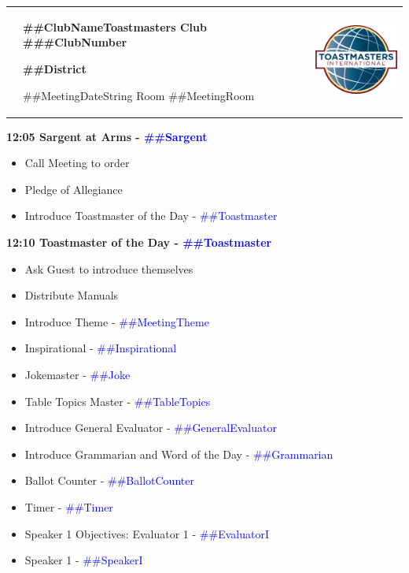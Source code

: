 \documentclass{article}
\newcommand{\clubName}{##ClubName}
\newcommand{\clubNumber}{##ClubNumber}
\newcommand{\district}{##District}
\newcommand{\meetingRoom}{##MeetingRoom}
\newcommand{\meetingTheme}{##MeetingTheme}
\newcommand{\meetingDateString}{##MeetingDateString}
\newcommand{\toastmaster}{##Toastmaster}
\newcommand{\sargent}{##Sargent}
\newcommand{\tableTopics}{##TableTopics}
\newcommand{\generalEvaluator}{##GeneralEvaluator}
\newcommand{\evaluatorI}{##EvaluatorI}
\newcommand{\speakerI}{##SpeakerI}
\newcommand{\grammarian}{##Grammarian}
\newcommand{\timer}{##Timer}
\newcommand{\inspirational}{##Inspirational}
\newcommand{\ballotCounter}{##BallotCounter}
\newcommand{\joke}{##Joke}
\begin{document}
  \begin{spacing}{.8}
  \begin{tabular}{ p{4cm} p{12cm} p{4cm}}
    {\bf }
    &
    \begin{center}
      {\bf \clubName Toastmasters Club \#\clubNumber}
    
	  {\bf \district}
    
	  \meetingDateString{} Room \meetingRoom
    \end{center}      
    &
    \includegraphics[width=3cm]{logo}
  \end{tabular}
  {\Large \bf12:05 Sargent at Arms - \textcolor{blue}{\sargent{}}}
  \begin{itemize}
    \item Call Meeting to order
    \item Pledge of Allegiance
    \item Introduce Toastmaster of the Day - \textcolor{blue}{\toastmaster{}}
  \end{itemize}
  {\Large \bf12:10 Toastmaster of the Day - \textcolor{blue}{\toastmaster{}}} 
  \begin{itemize}
    \item Ask Guest to introduce themselves
    \item Distribute Manuals
    \item Introduce Theme - \textcolor{blue}{\meetingTheme{}}
    \item Inspirational - \textcolor{blue}{\inspirational{}}
    \item Jokemaster - \textcolor{blue}{\joke{}}
	\item Table Topics Master - \textcolor{blue}{\tableTopics{}}
    \item Introduce General Evaluator - \textcolor{blue}{\generalEvaluator{}}
	\item Introduce Grammarian and Word of the Day - \textcolor{blue}{\grammarian{}}
    \item Ballot Counter - \textcolor{blue}{\ballotCounter{}}
    \item Timer - \textcolor{blue}{\timer{}}
    \item Speaker 1 Objectives: Evaluator 1 - \textcolor{blue}{\evaluatorI{}}
    \item Speaker 1 - \textcolor{blue}{\speakerI{}}

\end{itemize}
\end{spacing}
\end{document}
